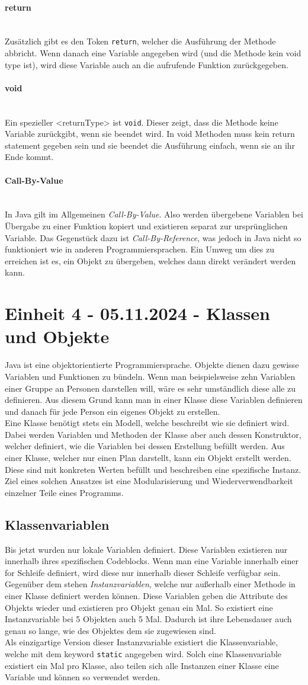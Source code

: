 \documentclass{article}
\newcommand{\paragraphlb}[1]{\paragraph{#1}\mbox{}\\}
\begin{document}
	\paragraphlb{return}
	Zusätzlich gibt es den Token \verb|return|, welcher die Ausführung der Methode abbricht. Wenn danach eine Variable angegeben wird (und die Methode kein void type ist), wird diese Variable auch an die aufrufende Funktion zurückgegeben.
	\paragraphlb{void}
	Ein spezieller <returnType> ist \verb|void|. Dieser zeigt, dass die Methode keine Variable zurückgibt, wenn sie beendet wird. In void Methoden muss kein return statement gegeben sein und sie beendet die Ausführung einfach, wenn sie an ihr Ende kommt. 
	\paragraphlb{Call-By-Value}
	In Java gilt im Allgemeinen \textit{Call-By-Value}. Also werden übergebene Variablen bei Übergabe zu einer Funktion kopiert und existieren separat zur ursprünglichen Variable. Das Gegenstück dazu ist \textit{Call-By-Reference}, was jedoch in Java nicht so funktioniert wie in anderen Programmiersprachen. Ein Umweg um dies zu erreichen ist es, ein Objekt zu übergeben, welches dann direkt verändert werden kann. 
	\section{Einheit 4 - 05.11.2024 - Klassen und Objekte}
	Java ist eine objektorientierte Programmiersprache. Objekte dienen dazu gewisse Variablen und Funktionen zu bündeln. Wenn man beispielsweise zehn Variablen einer Gruppe an Personen darstellen will, wäre es sehr umständlich diese alle zu definieren. Aus diesem Grund kann man in einer Klasse diese Variablen definieren und danach für jede Person ein eigenes Objekt zu erstellen. \\
	Eine Klasse benötigt stets ein Modell, welche beschreibt wie sie definiert wird. Dabei werden Variablen und Methoden der Klasse aber auch dessen Konstruktor, welcher definiert, wie die Variablen bei dessen Erstellung befüllt werden. Aus einer Klasse, welcher nur einen Plan darstellt, kann ein Objekt erstellt werden. Diese sind mit konkreten Werten befüllt und beschreiben eine spezifische Instanz. \\
	Ziel eines solchen Ansatzes ist eine Modularisierung und Wiederverwendbarkeit einzelner Teile eines Programms.
	\subsection{Klassenvariablen}
	Bis jetzt wurden nur lokale Variablen definiert. Diese Variablen existieren nur innerhalb ihres spezifischen Codeblocks. Wenn man eine Variable innerhalb einer for Schleife definiert, wird diese nur innerhalb dieser Schleife verfügbar sein. \\
	Gegenüber dem stehen \textit{Instanzvariablen}, welche nur außerhalb einer Methode in einer Klasse definiert werden können. Diese Variablen geben die Attribute des Objekts wieder und existieren pro Objekt genau ein Mal. So existiert eine Instanzvariable bei 5 Objekten auch 5 Mal. Dadurch ist ihre Lebensdauer auch genau so lange, wie des Objektes dem sie zugewiesen sind. \\
	Als einzigartige Version dieser Instanzvariable existiert die Klassenvariable, welche mit dem keyword \verb|static| angegeben wird. Solch eine Klassenvariable existiert ein Mal pro Klasse, also teilen sich alle Instanzen einer Klasse eine Variable und können so verwendet werden. \\
\end{document}

